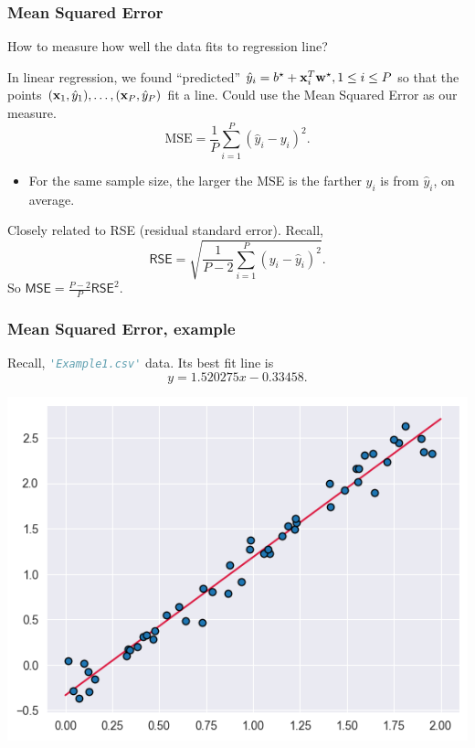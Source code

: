 \documentclass{beamer}
\theoremstyle{example}
\newcommand{\ct}[1]{\lstinline[language=Python,basicstyle=\ttfamily\footnotesize,stringstyle=\small\color{strings}]!#1!}
\begin{document}
\begin{frame}
\frametitle{Mean Squared Error}
How to measure how well the data fits to regression line?

\pause 
In linear regression, we found ``predicted'' $\hat{y}_i = b^\star + {\bf x}_i^T{\bf w}^\star, 1\le i\le P$ so that the points $({\bf x}_1,\hat{y}_1), \ldots, ({\bf x}_P, \hat{y}_P)$ fit a line. Could use the Mean Squared Error as our measure.
    \[ \text{MSE} = \frac{1}{P}\sum_{i=1}^P (\hat{y}_i-y_i)^2. \]
\pause
\begin{itemize}
    \item For the same sample size, the larger the MSE is the farther $y_i$ is from $\hat{y}_i$, on average.
\end{itemize}

\pause
Closely related to RSE (residual standard error). Recall, 
    \[\textsf{RSE} = \sqrt{\frac{1}{P-2}\sum_{i=1}^P(y_i - \hat{y}_i)^2}.\]
So $\textsf{MSE} = \frac{P-2}{P}\textsf{RSE}^2$.
\end{frame}

\begin{frame}
    \frametitle{Mean Squared Error, example}
    Recall, \ct{'Example1.csv'} data. Its best fit line is 
        \[y = 1.520275x - 0.33458.\]

    \vfill
    \centering
    \includegraphics[height=0.35\textheight]{../../Images/example1-lsrline.png}
\end{frame}
\end{document}
